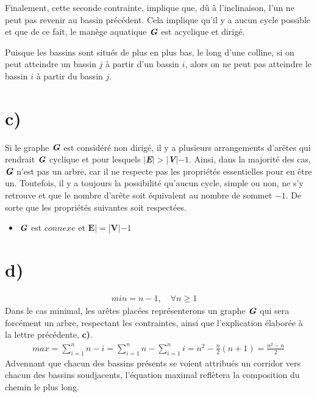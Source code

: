\documentclass[11pt,a4paper, oneside, oldfontcommands]{memoir}
\newcommand{\G}{$\textbf{\textit{G}}$}
\newcommand{\V}{$\textbf{\textit{V}}$}
\newcommand{\E}{$\textbf{\textit{E}}$}
\begin{document}
  
  Finalement, cette seconde contrainte, implique que, dû à l'inclinaison, l'un ne peut pas revenir au bassin précédent. Cela implique qu'il y a aucun cycle possible et que de ce fait, le manège aquatique \G{} est acyclique et dirigé.\\
  
  \begin{siderules}
    Puisque les bassins sont situés de plus en plus bas, le long d'une colline, si on peut atteindre un bassin $j$ à partir d'un bassin $i$, alors on ne peut pas atteindre le bassin $i$ à partir du bassin $j$.
  \end{siderules}


\section{c)}
Si le graphe \G{} est considéré non dirigé, il y a plusieurs arrangements d'arêtes qui rendrait \G{} cyclique et pour lesquels $|\E{}| > |\V{}| - 1$. Ainsi, dans la majorité des cas, \G{} n'est pas un arbre, car il ne respecte pas les propriétés essentielles pour en être un. Toutefois, il y a toujours la possibilité qu'aucun cycle, simple ou non, ne s'y retrouve et que le nombre d'arête soit équivalent au nombre de sommet $- 1$. De sorte que les propriétés suivantes soit respectées.\\
  \begin{itemize}
    \item\G{} est $connexe$ et $\textbf{E}| = |\textbf{V}| - 1$
  \end{itemize} 

\section{d)}



  \begin{gather*}
    min = n-1,\quad \forall n \geq 1\quad
  \end{gather*}
  Dans le cas minimal, les arêtes placées représenterons un graphe \G{} qui sera forcément un arbre, respectant les contraintes, ainsi que l'explication élaborée à la lettre précédente, \textbf{c)}.\\
  \begin{gather*}
    max = \sum_{i=1}^{n} {n-i}=\sum_{i=1}^{n} {n}-\sum_{i=1}^{n} {i}=n^{2}-\frac{n}{2}(n+1)=\frac{n^{2}-n}{2}
  \end{gather*}
  Advennant que chacun des bassins présents se voient attribués un corridor vers chacun des bassins soudjacents, l'équation maximal reflètera la composition du chemin le plus long. 
\end{document}
